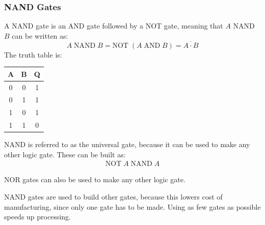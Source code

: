             \subsubsection{NAND Gates}
                A NAND gate is an AND gate followed by a NOT gate, meaning that $A$ NAND $B$ can be written as:
                \begin{equation}
                    A\;\text{NAND}\;B=\text{NOT}\;(A\;\text{AND}\;B)=\overline{A\cdot B}
                \end{equation}
                The truth table is:
                \begin{center}
                    \begin{tabular}{c c|c}
                        \textbf{A} & \textbf{B} & \textbf{Q} \\
                        \hline
                        0 & 0 & 1 \\
                        0 & 1 & 1 \\
                        1 & 0 & 1 \\
                        1 & 1 & 0
                    \end{tabular}
                \end{center}

                NAND is referred to as the universal gate, because it can be used to make any other logic gate.
                These can be built as:
                \begin{equation}
                    \begin{aligned}
                        \text{NOT}\;A\;\text{NAND}\;A
                    \end{aligned}
                \end{equation}

                NOR gates can also be used to make any other logic gate.

                NAND gates are used to build other gates, because this lowers cost of manufacturing, since only one gate has to be made.
                Using as few gates as possible speeds up processing.

